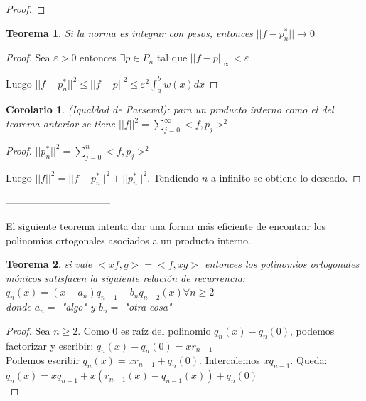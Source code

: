 \documentclass[10pt,a4paper,final]{report}
\newtheorem{theorem}{Teorema}
\newtheorem{corollary}{Corolario}
\begin{document}
{\begin{proof}
\end{proof}


\begin{theorem}Si la norma es integrar con pesos, entonces $||f-p_n^*|| \to 0$
\end{theorem}

\begin{proof}
Sea $\varepsilon > 0$ entonces $\exists p \in P_n$ tal que $||f-p||_\infty < \varepsilon$

Luego $||f-p_n^*||^2 \leq ||f-p||^2 \leq \varepsilon^2 \int_a^b w(x) dx$ \bigskip
\end{proof}

\begin{corollary}(Igualdad de Parseval): para un producto interno como el del teorema anterior se tiene $||f||^2 = \displaystyle \sum_{j=0}^\infty <f,p_j>^2$
\end{corollary}

\begin{proof}

$||p_n^*||^2 = \displaystyle \sum_{j=0}^n <f,p_j>^2$

Luego $||f||^2 = ||f-p_n^*||^2 + ||p_n^*||^2$. Tendiendo $n$ a infinito se obtiene lo deseado.
\end{proof}
--------------------------------

El siguiente teorema intenta dar una forma más eficiente de encontrar los polinomios ortogonales asociados a un producto interno.

\begin{theorem}

 si vale $<xf,g> = <f,xg>$ entonces los polinomios ortogonales mónicos satisfacen la siguiente relación de recurrencia:\\

$q_n(x) = (x-a_n) q_{n-1} - b_n q_{n-2}(x) \forall n \geq 2$ 
\\
donde $a_n=$ "algo" y $b_n=$ "otra cosa"\\
\end{theorem}

\begin{proof}

Sea $n\geq 2$. Como 0 es raíz del polinomio $q_n(x) - q_n(0)$, podemos factorizar y escribir: $q_n(x) - q_n(0) = x r_{n-1}$\\

Podemos escribir $q_n(x) = x r_{n-1} + q_n(0)$. Intercalemos $x q_{n-1}$. Queda:
$q_n(x) = x q_{n-1} + x (r_{n-1}(x) - q_{n-1}(x)) + q_n(0)$\\


\end{proof}}
\end{document}
